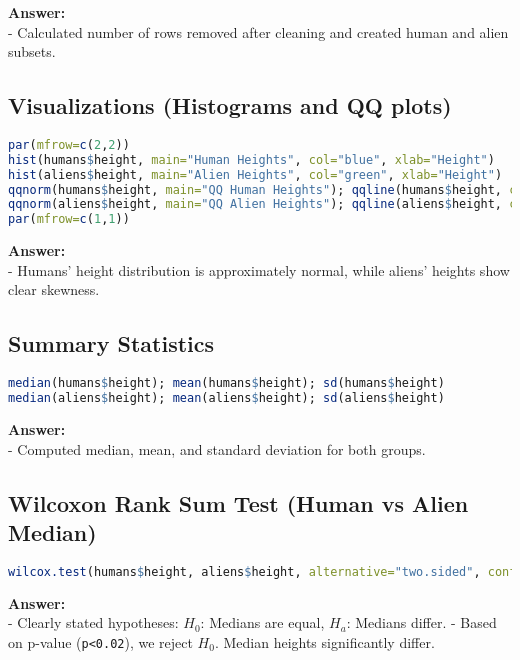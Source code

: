 \documentclass{article}
\begin{document}
\textbf{Answer:}\\
- Calculated number of rows removed after cleaning and created human and alien subsets.

\subsection*{Visualizations (Histograms and QQ plots)}

\begin{lstlisting}[language=R]
par(mfrow=c(2,2))
hist(humans$height, main="Human Heights", col="blue", xlab="Height")
hist(aliens$height, main="Alien Heights", col="green", xlab="Height")
qqnorm(humans$height, main="QQ Human Heights"); qqline(humans$height, col="red")
qqnorm(aliens$height, main="QQ Alien Heights"); qqline(aliens$height, col="red")
par(mfrow=c(1,1))
\end{lstlisting}

\textbf{Answer:}\\
- Humans’ height distribution is approximately normal, while aliens’ heights show clear skewness.

\subsection*{Summary Statistics}

\begin{lstlisting}[language=R]
median(humans$height); mean(humans$height); sd(humans$height)
median(aliens$height); mean(aliens$height); sd(aliens$height)
\end{lstlisting}

\textbf{Answer:}\\
- Computed median, mean, and standard deviation for both groups.

\subsection*{Wilcoxon Rank Sum Test (Human vs Alien Median)}

\begin{lstlisting}[language=R]
wilcox.test(humans$height, aliens$height, alternative="two.sided", conf.level=0.98)
\end{lstlisting}

\textbf{Answer:}\\
- Clearly stated hypotheses: \(H_0\): Medians are equal, \(H_a\): Medians differ.
- Based on p-value (\texttt{p<0.02}), we reject \(H_0\). Median heights significantly differ.
\end{document}
